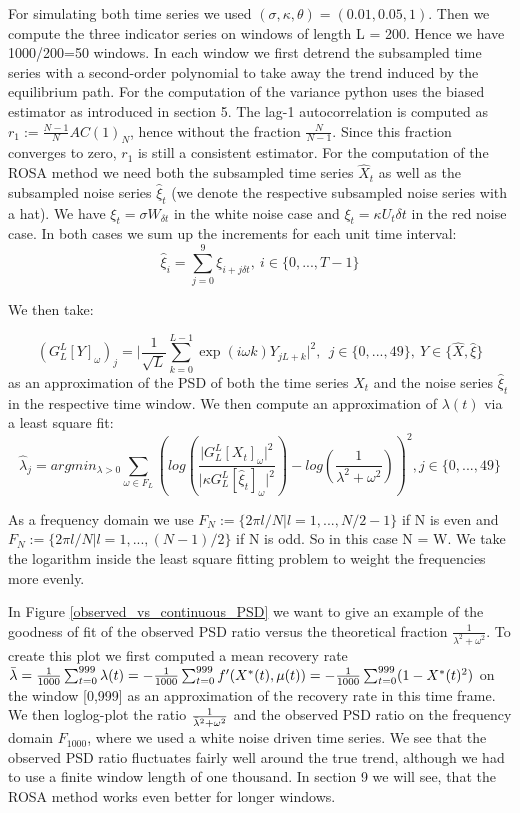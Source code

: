 \documentclass[%
thesis=student,%
coverpage=false,%
titlepage=false,%
headmarks=true, %
english,%
font=libertine, %
math=newpxtx, %
BCOR=5mm,%
coverBCOR=11mm%
]{tumbook}
\begin{document}
For simulating both time series we used $(\sigma,\kappa,\theta) = (0.01,0.05,1)$. 
Then we compute the three indicator series on windows of length L = 200. Hence we have 1000/200=50 windows. In each window we first detrend the subsampled time series with a second-order polynomial to take away the trend induced by the equilibrium path. For the computation of the variance python uses the biased estimator as introduced in section 5. The lag-1 autocorrelation is computed as $r_{1} := \frac{N-1}{N}AC(1)_{N}$, hence without the fraction $\frac{N}{N-1}$. Since this fraction converges to zero, $r_{1}$ is still a consistent estimator. For the computation of the ROSA method we need both the subsampled time series $\widehat{X}_{t}$ as well as the subsampled noise series $\widehat{\xi}_{t}$ (we denote the respective subsampled noise series with a hat). We have $\xi_{t} = \sigma W_{\delta t}$ in the white noise case and $\xi_{t} = \kappa U_{t} \delta t$ in the red noise case. In both cases we sum up the increments for each unit time interval:
\[
\widehat{\xi}_{i} = \sum_{j = 0}^{9}\xi_{i+j\delta t}, \ i \in \{0,...,T-1\}
\]

We then take:

\[
(G_{L}^{L}[Y]_{\omega})_{j} = \lvert \frac{1}{\sqrt{L}}\sum_{k=0}^{L-1}\exp(i\omega k)Y_{jL + k} \rvert ^2, \ \ j \in \{0,...,49\}, \ Y \in \{\widehat{X}, \widehat{\xi}\}
\]
as an approximation of the PSD of both the time series $X_{t}$ and the noise series $\widehat{\xi}_{t}$ in the respective time window. We then compute an approximation of $\lambda(t)$ via a least square fit:
\[
\widehat{\lambda}_{j} = argmin_{\lambda > 0} \sum_{\omega \in F_{L}} (log(\frac{\lvert G_{L}^{L}[X_{t}]_{\omega}\rvert^2}{\lvert \kappa G_{L}^{L}[\widehat{\xi}_{t}]_{\omega} \rvert^2}) - log(\frac{1}{\lambda^2 + \omega^2}))^2, j \in \{0,...,49\}
\]

As a frequency domain we use $F_{N}:=\{2\pi l/N | l = 1,...,N/2 - 1\}$ if N is even and $F_{N} := \{2\pi l/N | l = 1,...,(N-1)/2 \}$ if N is odd. So in this case N = W. We take the logarithm inside the least square fitting problem to weight the frequencies more evenly. 

In Figure \ref{observed_vs_continuous_PSD} we want to give an example of the goodness of fit of the observed PSD ratio versus the theoretical fraction $\frac{1}{\lambda^2 + \omega^2}$. To create this plot we first computed a mean recovery rate $\Bar{\lambda} = \frac{1}{1000}\sum_{t=0}^{999}\lambda(t) = -\frac{1}{1000}\sum_{t=0}^{999}f'(X^{*}(t),\mu(t)) = -\frac{1}{1000}\sum_{t=0}^{999}(1-X^{*}(t)^2)$ on the window [0,999] as an approximation of the recovery rate in this time frame. We then loglog-plot the ratio $\frac{1}{\Bar{\lambda}^2 + \omega^2}$ and the observed PSD ratio on the frequency domain $F_{1000}$, where we used a white noise driven time series. We see that the observed PSD ratio fluctuates fairly well around the true trend, although we had to use a finite window length of one thousand.
In section 9 we will see, that the ROSA method works even better for longer windows.
\end{document}
